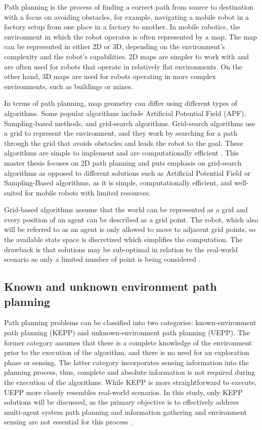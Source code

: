 Path planning is the process of finding a correct path from source to destination with a focus on avoiding obstacles, for example, navigating a mobile robot in a factory setup from one place in a factory to another\cite{path_planning}. In mobile robotics, the environment in which the robot operates is often represented by a map. The map can be represented in either 2D or 3D, depending on the environment's complexity and the robot's capabilities. 2D maps are simpler to work with and are often used for robots that operate in relatively flat environments. On the other hand, 3D maps are used for robots operating in more complex environments, such as buildings or mines.

In terms of path planning, map geometry can differ using different types of algorithms. Some popular algorithms include Artificial Potential Field (APF), Sampling-based methods, and grid-search algorithms. Grid-search algorithms use a grid to represent the environment, and they work by searching for a path through the grid that avoids obstacles and leads the robot to the goal. These algorithms are simple to implement and are computationally efficient \cite{not_grid_based}. This master thesis focuses on 2D path planning and  puts emphasis on grid-search algorithms as opposed to different solutions such as Artificial Potential Field or Sampling-Based algorithms, as it is simple, computationally efficient, and well-suited for mobile robots with limited resources.

Grid-based algorithms assume that the world can be represented as a grid and every position of an agent can be described as a grid point. The robot, which also will be referred to as an agent is only allowed to move to adjacent grid points, so the available state space is discretized which simplifies the computation. The drawback is that solutions may be sub-optimal in relation to the real-world scenario as only a limited number of point is being considered \cite{SARANYA2014766}.

\subsection{Known and unknown environment path planning}
Path planning problems can be classified into two categories: known-environment path planning (KEPP) and unknown-environment path planning (UEPP). The former category assumes that there is a complete knowledge of the environment prior to the execution of the algorithm, and there is no need for an exploration phase or sensing. The latter category incorporates sensing information into the planning process, thus, complete and absolute information is not required during the execution of the algorithms. While KEPP is more straightforward to execute, UEPP more closely resembles real-world scenarios. In this study, only KEPP solutions will be discussed, as the primary objective is to effectively address multi-agent system path planning and information gathering and environment sensing are not essential for this process \cite{path_planning_protocols}.